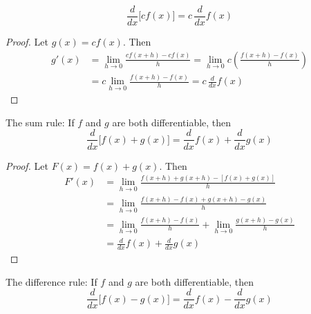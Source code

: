 \[\frac{d}{dx}\bigl[cf(x)\bigr]=c\,\frac{d}{dx}f(x)\]
\begin{proof}
    Let \(g(x)=cf(x)\).
    Then
    \begin{align*}
        g'(x) &= \lim_{h\to 0}\frac{cf(x+h)-cf(x)}{h}
        =\lim_{h\to 0}c\left(\frac{f(x+h)-f(x)}{h}\right) \\
        &= c\lim_{h\to 0}\frac{f(x+h)-f(x)}{h}
        =c\,\frac{d}{dx}f(x)
    \end{align*}
\end{proof}
The sum rule: If \(f\) and \(g\) are both differentiable, then
\[\frac{d}{dx}\bigl[f(x)+g(x)\bigr]=\frac{d}{dx}f(x)+\frac{d}{dx}g(x)\]
\begin{proof}
    Let \(F(x)=f(x)+g(x)\).
    Then
    \begin{align*}
        F'(x) &= \lim_{h\to 0}\frac{f(x+h)+g(x+h)-[f(x)+g(x)]}{h} \\
        &= \lim_{h\to 0}\frac{f(x+h)-f(x)+g(x+h)-g(x)}{h} \\
        &= \lim_{h\to 0}\frac{f(x+h)-f(x)}{h}
        +\lim_{h\to 0}\frac{g(x+h)-g(x)}{h} \\
        &= \frac{d}{dx}f(x)+\frac{d}{dx}g(x)
    \end{align*}
\end{proof}
The difference rule: If \(f\) and \(g\) are both differentiable, then
\[\frac{d}{dx}\bigl[f(x)-g(x)\bigr]=\frac{d}{dx}f(x)-\frac{d}{dx}g(x)\]

